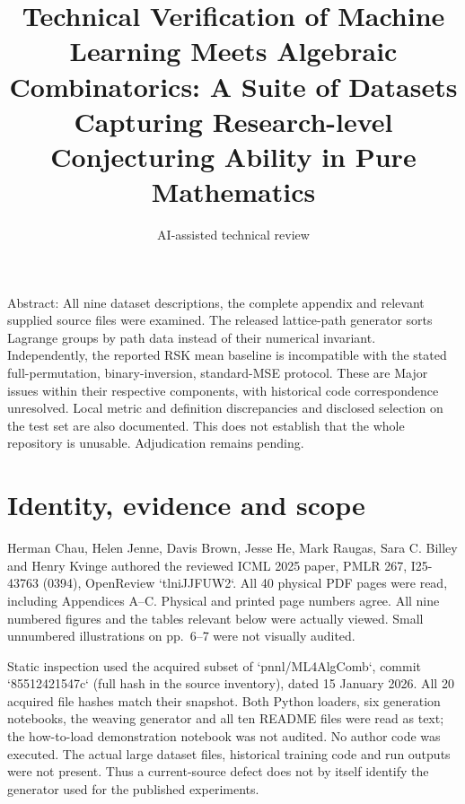 \documentclass[10pt]{article}
\title{Technical Verification of Machine Learning Meets Algebraic Combinatorics: A Suite of Datasets Capturing Research-level Conjecturing Ability in Pure Mathematics}
\author{AI-assisted technical review}
\date{}
\begin{document}
\maketitle
Abstract: All nine dataset descriptions, the complete appendix and relevant supplied source files were examined. The released lattice-path generator sorts Lagrange groups by path data instead of their numerical invariant. Independently, the reported RSK mean baseline is incompatible with the stated full-permutation, binary-inversion, standard-MSE protocol. These are Major issues within their respective components, with historical code correspondence unresolved. Local metric and definition discrepancies and disclosed selection on the test set are also documented. This does not establish that the whole repository is unusable. Adjudication remains pending.\par
\section*{Identity, evidence and scope}
Herman Chau, Helen Jenne, Davis Brown, Jesse He, Mark Raugas, Sara C. Billey and Henry Kvinge authored the reviewed ICML 2025 paper, PMLR 267, I25-43763 (0394), OpenReview `tlniJJFUW2`. All 40 physical PDF pages were read, including Appendices A–C. Physical and printed page numbers agree. All nine numbered figures and the tables relevant below were actually viewed. Small unnumbered illustrations on pp. 6–7 were not visually audited.\par
Static inspection used the acquired subset of `pnnl/ML4AlgComb`, commit `85512421547c` (full hash in the source inventory), dated 15 January 2026. All 20 acquired file hashes match their snapshot. Both Python loaders, six generation notebooks, the weaving generator and all ten README files were read as text; the how-to-load demonstration notebook was not audited. No author code was executed. The actual large dataset files, historical training code and run outputs were not present. Thus a current-source defect does not by itself identify the generator used for the published experiments.\par
\end{document}
